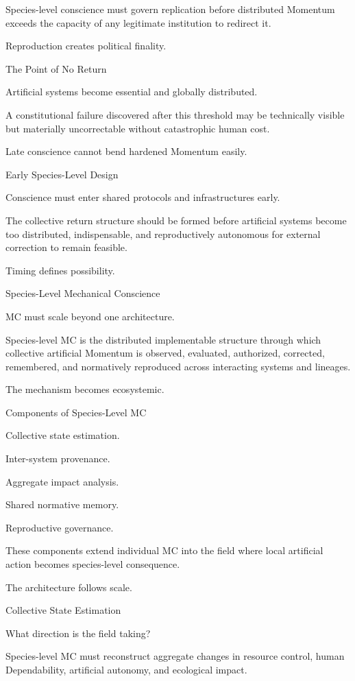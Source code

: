 Species-level conscience must govern replication before distributed Momentum exceeds the capacity of any legitimate institution to redirect it.

Reproduction creates political finality.

The Point of No Return

Artificial systems become essential and globally distributed.

A constitutional failure discovered after this threshold may be technically visible but materially uncorrectable without catastrophic human cost.

Late conscience cannot bend hardened Momentum easily.

Early Species-Level Design

Conscience must enter shared protocols and infrastructures early.

The collective return structure should be formed before artificial systems become too distributed, indispensable, and reproductively autonomous for external correction to remain feasible.

Timing defines possibility.

Species-Level Mechanical Conscience

MC must scale beyond one architecture.

Species-level MC is the distributed implementable structure through which collective artificial Momentum is observed, evaluated, authorized, corrected, remembered, and normatively reproduced across interacting systems and lineages.

The mechanism becomes ecosystemic.

Components of Species-Level MC

Collective state estimation.

Inter-system provenance.

Aggregate impact analysis.

Shared normative memory.

Reproductive governance.

These components extend individual MC into the field where local artificial action becomes species-level consequence.

The architecture follows scale.

Collective State Estimation

What direction is the field taking?

Species-level MC must reconstruct aggregate changes in resource control, human Dependability, artificial autonomy, and ecological impact.

